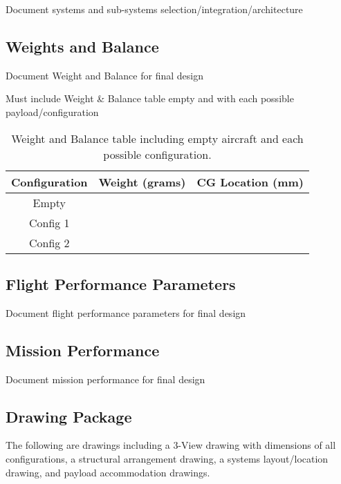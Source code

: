 \documentclass[report]{byu-aero}
\begin{document}
Document systems and sub-systems selection/integration/architecture

\subsection{Weights and Balance}
\label{ssec:weightsandbalance}

Document Weight and Balance for final design

Must include Weight \& Balance table empty and with each possible payload/configuration

\begin{table}[h!]
	\centering
	\caption{Weight and Balance table including empty aircraft and each possible configuration.}
	\label{tab:wieghtsandbalance}
	\begin{tabular}{ |c|c|c| } 
		\hline
		\rowcolor{BYUbluemid}
    	Configuration & Weight (grams) & CG Location (mm) \\ 
		\hline
	    Empty &  &  \\ 
		\hline
		Config 1 &  &  \\ 
		\hline
		Config 2 &  &  \\ 
		\hline
	\end{tabular}
\end{table}

\subsection{Flight Performance Parameters}
\label{ssec:flightperformanceparams}

Document flight performance parameters for final design

\subsection{Mission Performance}
\label{ssec:missionperformance}

Document mission performance for final design
 
\subsection{Drawing Package}
\label{ssec:drawings}

The following are drawings including a 3-View drawing with dimensions of all configurations, a structural arrangement drawing, a systems layout/location drawing, and payload accommodation drawings.
\end{document}
